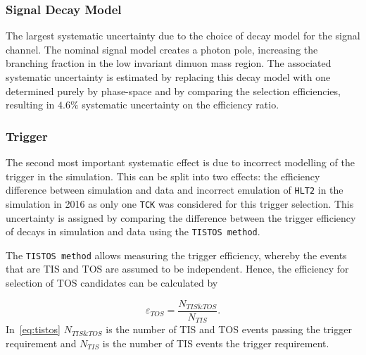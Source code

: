 \subsubsection{Signal Decay Model}
The largest systematic uncertainty \DIFdelbegin {}\DIFdelend \DIFaddbegin {}\DIFaddend due to the choice of decay model for the signal channel.
The nominal signal model creates a photon pole, increasing the branching fraction in the low invariant dimuon mass region.
The associated systematic uncertainty is estimated by replacing this decay model with one determined purely by phase-space and by comparing the selection efficiencies, resulting in \DIFaddbegin {}\DIFaddend $4.6\%$ \DIFaddbegin {}\DIFaddend systematic uncertainty on the efficiency ratio. \DIFaddbegin {}\DIFaddend %

\subsubsection{Trigger}
The second most important systematic effect is due to incorrect modelling of the trigger in the simulation. This can be split into two effects:
 the efficiency difference between \DIFdelbegin {}\DIFdelend \DIFaddbegin {}\DIFaddend simulation and data and \DIFaddbegin {}\DIFaddend incorrect emulation of \texttt{HLT2} in the simulation in 2016 as only one \texttt{TCK} was considered for this trigger selection. This uncertainty is assigned by comparing the difference between the trigger efficiency of \bjpsimumuk decays in simulation and data using the \texttt{TISTOS method}.

The \texttt{TISTOS method} allows measuring the trigger efficiency, whereby the events that are \gls{TIS} and \gls{TOS} are assumed to be independent. Hence, the efficiency
for selection of \gls{TOS} candidates can be calculated by

\begin{equation}
\varepsilon_{TOS} = \frac{N_{TIS\&TOS}}{N_{TIS}}.
\label{eq:tistos}
\end{equation}
In~\autoref{eq:tistos} $N_{TIS\&TOS}$ is the number of \gls{TIS} and \gls{TOS} events passing the trigger requirement and $N_{TIS}$ is the number of \gls{TIS} events \DIFdelbegin {}\DIFdelend \DIFaddbegin {}\DIFaddend the trigger requirement.

